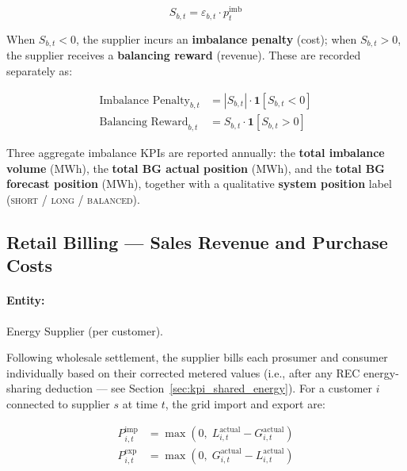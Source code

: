 \begin{equation}
    S_{b,t} = \varepsilon_{b,t} \cdot p^{\mathrm{imb}}_t
    \label{eq:imbalance_settlement}
\end{equation}

When $S_{b,t} < 0$, the supplier incurs an \textbf{imbalance penalty} (cost); when $S_{b,t} > 0$, the supplier receives a \textbf{balancing reward} (revenue). These are recorded separately as:

\begin{align}
    \text{Imbalance Penalty}_{b,t} &= \left|S_{b,t}\right| \cdot \mathbf{1}\!\left[S_{b,t} < 0\right]
    \label{eq:penalty} \\[4pt]
    \text{Balancing Reward}_{b,t}  &= S_{b,t} \cdot \mathbf{1}\!\left[S_{b,t} > 0\right]
    \label{eq:reward}
\end{align}

Three aggregate imbalance KPIs are reported annually: the \textbf{total imbalance volume} (MWh), the \textbf{total BG actual position} (MWh), and the \textbf{total BG forecast position} (MWh), together with a qualitative \textbf{system position} label (\textsc{short} / \textsc{long} / \textsc{balanced}).

\subsection{Retail Billing — Sales Revenue and Purchase Costs}
\label{sec:kpi_retail}

\paragraph{Entity:} Energy Supplier (per customer).

Following wholesale settlement, the supplier bills each prosumer and consumer individually based on their corrected metered values (i.e., after any REC energy-sharing deduction — see Section~\ref{sec:kpi_shared_energy}). For a customer $i$ connected to supplier $s$ at time $t$, the grid import and export are:

\begin{align}
    P^{\mathrm{imp}}_{i,t} &= \max\!\left(0,\; L^{\mathrm{actual}}_{i,t} - G^{\mathrm{actual}}_{i,t}\right)
    \label{eq:grid_import} \\[4pt]
    P^{\mathrm{exp}}_{i,t} &= \max\!\left(0,\; G^{\mathrm{actual}}_{i,t} - L^{\mathrm{actual}}_{i,t}\right)
    \label{eq:grid_export}
\end{align}


